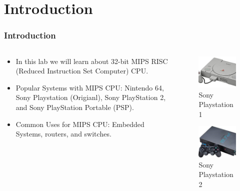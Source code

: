 \documentclass[
	11pt, %
]{beamer}
\begin{document}
\section{Introduction}
\begin{frame}
	\frametitle{Introduction}
	\begin{columns}[c] %
		\begin{column}{0.65\textwidth} %
			\begin{itemize}
				\item In this lab we will learn about 32-bit MIPS RISC (Reduced Instruction Set Computer) CPU.
				\item Popular Systems with MIPS CPU: Nintendo 64, Sony Playstation (Origianl), Sony PlayStation 2, and Sony PlayStation Portable (PSP).
				\item Common Uses for MIPS CPU: Embedded Systems, routers, and switches.
			\end{itemize}
		\end{column}
		
		\begin{column}{0.35\textwidth} %
			\begin{figure}
				\includegraphics[width=0.5\linewidth]{ps1.png}
				\caption{Sony Playstation 1}
			\end{figure}
			\begin{figure}
				\includegraphics[width=0.5\linewidth]{ps2.png}
				\caption{Sony Playstation 2}
			\end{figure}
		\end{column}
	\end{columns}
\end{frame}
\end{document}
